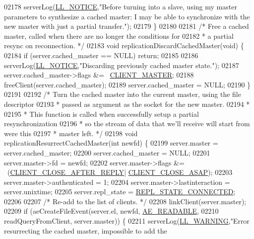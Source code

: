 \begin{DoxyCode}
{{{{{{{{{{{{{{{{{{{{{{{{{{{{{{{{{{{{{{{{{{{{{{{{{{{{{{{{{{{{{{{{{{{{{{{{{02178     serverLog(\hyperlink{server_8h_a8c54c191e436c7dd3012167212692401}{LL\_NOTICE},\textcolor{stringliteral}{"Before turning into a slave, using my master parameters to
       synthesize a cached master: I may be able to synchronize with the new master with just a partial transfer."});
02179 \}
02180 
02181 \textcolor{comment}{/* Free a cached master, called when there are no longer the conditions for}
02182 \textcolor{comment}{ * a partial resync on reconnection. */}
02183 \textcolor{keywordtype}{void} replicationDiscardCachedMaster(\textcolor{keywordtype}{void}) \{
02184     \textcolor{keywordflow}{if} (server.cached\_master == NULL) \textcolor{keywordflow}{return};
02185 
02186     serverLog(\hyperlink{server_8h_a8c54c191e436c7dd3012167212692401}{LL\_NOTICE},\textcolor{stringliteral}{"Discarding previously cached master state."});
02187     server.cached\_master->flags &= ~\hyperlink{server_8h_a3d8f0cc8d0653ee2b6dafb454292c069}{CLIENT\_MASTER};
02188     freeClient(server.cached\_master);
02189     server.cached\_master = NULL;
02190 \}
02191 
02192 \textcolor{comment}{/* Turn the cached master into the current master, using the file descriptor}
02193 \textcolor{comment}{ * passed as argument as the socket for the new master.}
02194 \textcolor{comment}{ *}
02195 \textcolor{comment}{ * This function is called when successfully setup a partial resynchronization}
02196 \textcolor{comment}{ * so the stream of data that we'll receive will start from were this}
02197 \textcolor{comment}{ * master left. */}
02198 \textcolor{keywordtype}{void} replicationResurrectCachedMaster(\textcolor{keywordtype}{int} newfd) \{
02199     server.master = server.cached\_master;
02200     server.cached\_master = NULL;
02201     server.master->fd = newfd;
02202     server.master->flags &= ~(\hyperlink{server_8h_a8cff2154afcc2e87ac85bdbbe2814091}{CLIENT\_CLOSE\_AFTER\_REPLY}|
      \hyperlink{server_8h_ad6690c6231b67525b8b2057e092a8361}{CLIENT\_CLOSE\_ASAP});
02203     server.master->authenticated = 1;
02204     server.master->lastinteraction = server.unixtime;
02205     server.repl\_state = \hyperlink{server_8h_aed693b3a9cdfc05cf5ab7551a8c86fbe}{REPL\_STATE\_CONNECTED};
02206 
02207     \textcolor{comment}{/* Re-add to the list of clients. */}
02208     linkClient(server.master);
02209     \textcolor{keywordflow}{if} (aeCreateFileEvent(server.el, newfd, \hyperlink{ae_8h_a7a9a2162d007d09739955b4e55c65bf3}{AE\_READABLE},
02210                           readQueryFromClient, server.master)) \{
02211         serverLog(\hyperlink{server_8h_a31229b9334bba7d6be2a72970967a14b}{LL\_WARNING},\textcolor{stringliteral}{"Error resurrecting the cached master, impossible to add the
}}}}}}}}}}}}}}}}}}}}}}}}}}}}}}}}}}}}}}}}}}}}}}}}}}}}}}}}}}}}}}}}}}}}}}}}}}
\end{DoxyCode}
